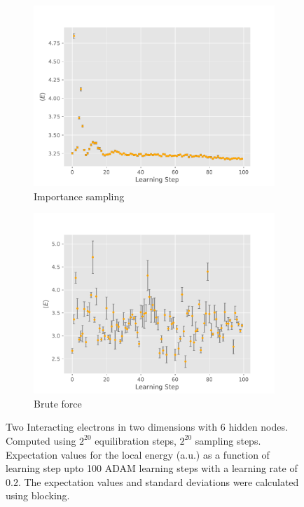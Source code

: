 \documentclass[11pt,a4paper,titlepage]{article}
\begin{document}
\begin{figure}[H]
\begin{subfigure}[t]{.5\textwidth}
\centering
\includegraphics[trim=0cm 0.0cm 0cm 0cm,scale = 0.5]{D2_P_2I_Y__S_2pow20_eqS_2pow20_GD_ls_v_E_LR_0.200000_NH_6_Adaptive_1_Importance.pdf}
\caption{Importance sampling}
\label{J1}
\end{subfigure}
\begin{subfigure}[t]{.5\textwidth}
\centering
\includegraphics[trim=0cm 0.0cm 0cm 0.0cm,scale = 0.5]{D2_P_2I_Y__S_2pow20_eqS_2pow20_GD_ls_v_E_LR_0.200000_NH_6_Adaptive_1BruteForce.pdf}
\caption{Brute force}
\label{J2}
\end{subfigure}
\caption[Brute force v. Importance sampling]{Two Interacting electrons in two dimensions with 6 hidden nodes. Computed using $2^{20}$ equilibration steps, $2^{20}$ sampling steps. Expectation values for the local energy (a.u.) as a function of learning step upto 100 ADAM learning steps with a learning rate of $0.2$. The expectation values and standard deviations were calculated using blocking.}
\label{fig:BF_v_importance}
\end{figure}
\end{document}
